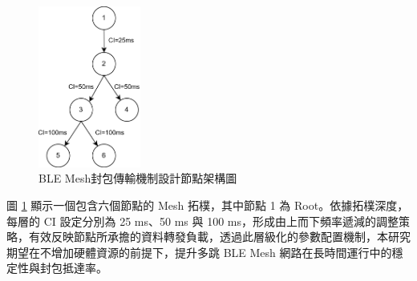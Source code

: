 \begin{ZhChapter}
\begin{figure}[H]
    \centering
    \includegraphics[width = 0.3\textwidth]{image/BLE Mesh封包傳輸機制設計節點架構圖.png}
    \caption{BLE Mesh封包傳輸機制設計節點架構圖}
    \label{fig: BLE Mesh封包傳輸機制設計節點架構圖}
\end{figure}

圖 \ref{fig: BLE Mesh封包傳輸機制設計節點架構圖} 顯示一個包含六個節點的 Mesh 拓樸，其中節點 1 為 Root。依據拓樸深度，每層的 CI 設定分別為 25 ms、50 ms 與 100 ms，形成由上而下頻率遞減的調整策略，有效反映節點所承擔的資料轉發負載，透過此層級化的參數配置機制，本研究期望在不增加硬體資源的前提下，提升多跳 BLE Mesh 網路在長時間運行中的穩定性與封包抵達率。

\end{ZhChapter}